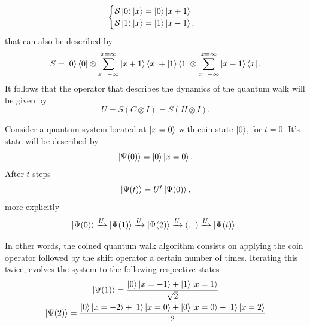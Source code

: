 \documentclass[../../dissertation.tex]{subfiles}
\begin{document}
\begin{equation}
	\begin{cases}
		\mathcal{S} \ket{0}\ket{x} = \ket{0}\ket{x+1}\\
		\mathcal{S} \ket{1}\ket{x} = \ket{1}\ket{x-1},
	\end{cases}
\end{equation}
that can also be described by
\begin{equation}
	S = \ket{0}\bra{0} \otimes \sum_{x=-\infty}^{x=\infty} \ket{x+1}\bra{x} + \ket{1}\bra{1}\otimes \sum_{x=-\infty}^{x=\infty} \ket{x-1}\bra{x}.
\end{equation}
It follows that the operator that describes the dynamics of the quantum walk will be given by 
\begin{equation}
	U = S(C\otimes I) = S(H\otimes I). \label{coinedUnmarkedOperator}
\end{equation}\par
Consider a quantum system located at $\ket{x = 0}$ with coin state $\ket{0}$, for $t=0$. It's state will be described by
\begin{equation}
	\ket{\Psi(0)} = \ket{0}\ket{x=0}.
	\label{eq:coinedQWInitCond0}
\end{equation}
After $t$ steps 
\begin{equation}
	\ket{\Psi(t)}=U^{t}\ket{\Psi(0)},
\end{equation}
more explicitly
\begin{equation}
	\ket{\Psi(0)}\xrightarrow[]{\text{$U$}}\ket{\Psi(1)}\xrightarrow[]{\text{$U$}}\ket{\Psi(2)}\xrightarrow[]{\text{$U$}} (...) \xrightarrow[]{\text{$U$}}\ket{\Psi(t)}.
\end{equation}\par
In other words, the coined quantum walk algorithm consists on applying the coin operator followed by the shift operator a certain number of times. Iterating this twice, evolves the system to the following respective states
\begin{gather}
	\ket{\Psi(1)} = \frac{\ket{0}\ket{x=-1}+\ket{1}\ket{x=1}}{\sqrt{2}}\label{eq:10}\\
	\ket{\Psi(2)} = \frac{\ket{0}\ket{x=-2}+\ket{1}\ket{x=0}+\ket{0}\ket{x=0}-\ket{1}\ket{x=2}}{2}\label{eq:11}\\
\end{gather}
\end{document}
